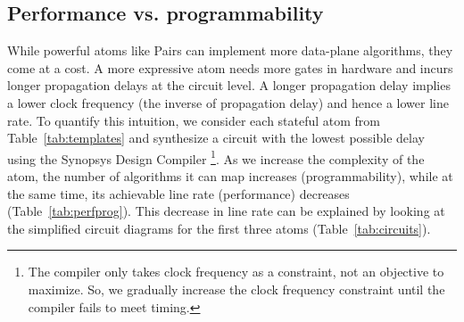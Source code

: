 \subsection{Performance vs. programmability}
\label{ss:perfprog}

While powerful atoms like Pairs can implement more data-plane algorithms, they
come at a cost.  A more expressive atom needs more gates in hardware and incurs
longer propagation delays at the circuit level. A longer propagation delay
implies a lower clock frequency (the inverse of propagation delay) and hence a
lower line rate. To quantify this intuition, we consider each stateful atom
from Table~\ref{tab:templates} and synthesize a circuit with the lowest
possible delay using the Synopsys Design Compiler \footnote{The compiler only
  takes clock frequency as a constraint, not an objective to maximize. So, we
gradually increase the clock frequency constraint until the compiler fails to
meet timing.}. As we increase the complexity of the atom, the number of
algorithms it can map increases (programmability), while at the same time, its
achievable line rate (performance) decreases (Table~\ref{tab:perfprog}). This
decrease in line rate can be explained by looking at the simplified circuit
diagrams for the first three atoms (Table~\ref{tab:circuits}).

